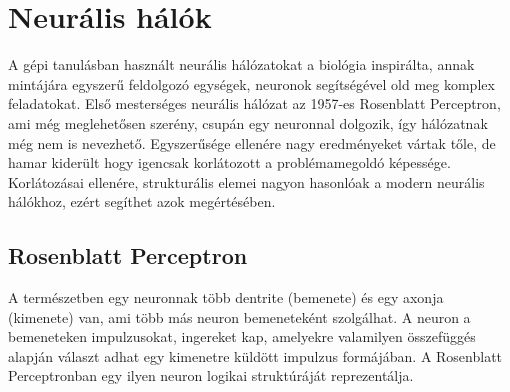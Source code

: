 
\chapter{Neurális hálók}\label{ch:nn}

A gépi tanulásban használt neurális hálózatokat a biológia inspirálta, annak mintájára egyszerű feldolgozó egységek, neuronok segítségével old meg komplex feladatokat. 
Első mesterséges neurális hálózat az 1957-es Rosenblatt Perceptron, ami még meglehetősen szerény, csupán egy neuronnal dolgozik, így hálózatnak még nem is nevezhető. Egyszerűsége ellenére nagy eredményeket vártak tőle, de hamar kiderült hogy igencsak korlátozott a problémamegoldó képessége. Korlátozásai ellenére, strukturális elemei nagyon hasonlóak a modern neurális hálókhoz, ezért segíthet azok megértésében.

\section{Rosenblatt Perceptron}

A természetben egy neuronnak több dentrite (bemenete) és egy axonja (kimenete) van, ami több más neuron bemeneteként szolgálhat. A neuron a bemeneteken impulzusokat, ingereket kap, amelyekre valamilyen összefüggés alapján választ adhat egy kimenetre küldött impulzus formájában. A Rosenblatt Perceptronban egy ilyen neuron logikai struktúráját reprezentálja. 

